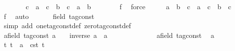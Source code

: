 \begin{isabellebody}
\ \ \ \ \isamarkupfalse%
\ \isamarkupfalse%
\ {\isachardoublequoteopen}c\ {\isacharasterisk}\ a\ {\isacharplus}\ c\ {\isacharasterisk}\ b\ {\isacharequal}\ c\ {\isacharasterisk}\ {\isacharparenleft}a\ {\isacharplus}\ b{\isacharparenright}{\isachardoublequoteclose}\isanewline
\ \ \ \ \ \ \isamarkupfalse%
\ f{}\ \isamarkupfalse%
\ force\isanewline
\ \ \isamarkupfalse%
\ \isamarkupfalse%
\ {\isachardoublequoteopen}{\isacharparenleft}a\ {\isacharplus}\ b{\isacharparenright}\ {\isacharasterisk}\ c\ {\isacharequal}\ a\ {\isacharasterisk}\ c\ {\isacharplus}\ b\ {\isacharasterisk}\ c{\isachardoublequoteclose}\isanewline
\ \ \ \ \isamarkupfalse%
\ f{}\ \isamarkupfalse%
\ auto\isanewline
\ \ \isamarkupfalse%
\isanewline
\ \ \isamarkupfalse%
\ {\isacartoucheopen}{\isacharparenleft}{}{\isacharcolon}{\isacharcolon}{\isacharparenleft}{\isacharprime}{\isasymtau}{\isacharcolon}{\isacharcolon}field\ tag{\isacharunderscore}const{\isacharparenright}{\isacharparenright}\ {\isasymnoteq}\ {}{\isacartoucheclose}\isanewline
\ \ \ \ \isamarkupfalse%
\ {\isacharparenleft}simp\ add{\isacharcolon}\ one{\isacharunderscore}tag{\isacharunderscore}const{\isacharunderscore}def\ zero{\isacharunderscore}tag{\isacharunderscore}const{\isacharunderscore}def{\isacharparenright}\isanewline
\ \ \isamarkupfalse%
\ {\isacartoucheopen}{\isasymAnd}{\isacharparenleft}a{\isacharcolon}{\isacharcolon}{\isacharparenleft}{\isacharprime}{\isasymtau}{\isacharcolon}{\isacharcolon}field\ tag{\isacharunderscore}const{\isacharparenright}{\isacharparenright}{\isachardot}\ a\ {\isasymnoteq}\ {}\ {\isasymLongrightarrow}\ inverse\ a\ {\isacharasterisk}\ a\ {\isacharequal}\ {}{\isacartoucheclose}\isanewline
\ \ \isamarkupfalse%
\ {\isacharminus}\isanewline
\ \ \ \ \isacommand{{\isacharbraceleft}}\isamarkupfalse%
\ \isamarkupfalse%
\ a{\isacharcolon}{\isacharcolon}{\isacartoucheopen}{\isacharparenleft}{\isacharprime}{\isasymtau}{\isacharcolon}{\isacharcolon}field\ tag{\isacharunderscore}const{\isacharparenright}{\isacartoucheclose}\ \isamarkupfalse%
\ {\isacartoucheopen}a\ {\isasymnoteq}\ {}{\isacartoucheclose}\isanewline
\ \ \ \ \ \ \isamarkupfalse%
\ {\isacartoucheopen}{\isasymexists}t{\isachardot}\ t{\isasymnoteq}{}\ {\isasymand}\ a\ {\isacharequal}\ {\isasymtau}\isactrlsub c\isactrlsub s\isactrlsub t\ t{\isacartoucheclose}\isanewline

\end{isabellebody}
